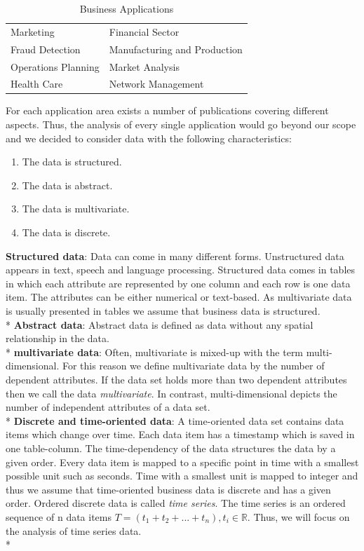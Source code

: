 \begin{table}[H]
	\centering
	\caption[Business Applications]{Business Applications\cite{Brachman1996,Tegarden1999}}
	\label{businessapplications}
	\begin{tabu}{ll}
	\toprule
	Marketing & Financial Sector \\
	Fraud Detection & Manufacturing and Production \\
	Operations Planning & Market Analysis \\
	Health Care & Network Management\\
	\bottomrule
	\end{tabu}
\end{table}
For each application area exists a number of publications covering different aspects. Thus, the analysis of every single application would go beyond our scope and we decided to consider data with the following characteristics: 
\begin{enumerate}
    \item The data is structured. 
    \item The data is abstract.
    \item The data is multivariate.
    \item The data is discrete.
\end{enumerate}
\textbf{Structured data}: Data can come in many different forms. Unstructured data appears in text, speech and language processing\cite{Borgo2013}. Structured data comes in tables in which each attribute are represented by one column and each row is one data item. The attributes can be either numerical or text-based. As multivariate data is usually presented in tables\cite{Borgo2013} we assume that business data is structured.\\*
\textbf{Abstract data}: Abstract data is defined as data without any spatial relationship in the data\cite{Shneiderman1996}. \\*
\textbf{multivariate data}: 
Often, multivariate is mixed-up with the term multi-dimensional. For this reason we define  multivariate data by the number of dependent attributes. If the data set holds more than two dependent attributes then we call the data \textit{multivariate}. In contrast, multi-dimensional depicts the number of independent attributes of a data set\cite{Aigner2011}.  \\*
\textbf{Discrete and time-oriented data}: A time-oriented data set contains data items which change over time. Each data item has a timestamp which is saved in one table-column. The time-dependency of the data structures the data by a given order. Every data item is mapped to a specific point in time with a smallest possible unit such as seconds. Time with a smallest unit is mapped to integer\cite{Aigner2011} and thus we assume that time-oriented business data is discrete and has a given order. Ordered discrete data is called \textit{time series}. The time series is an ordered sequence of n data items $T=(t_1+t_2+...+t_n),t_i\in\mathbb{R}$. Thus, we will focus on the analysis of time series data. \\*

